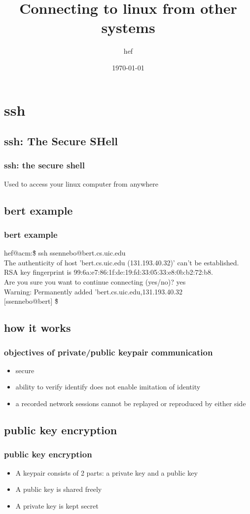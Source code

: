 \documentclass[hyperref={pdfpagelabels=false}]{beamer}
\title{Connecting to linux from other systems}
\author{hef}
\date{\today}
\begin{document}
\frame{\titlepage}
\section[outline]{}
\frame[shrink]{\tableofcontents}
\section{ssh}
\subsection{ssh: The Secure SHell}
\frame
{
  \frametitle{ssh: the secure shell}
  Used to access your linux computer from anywhere
}
\subsection{bert example}
\frame
{
  \frametitle{bert example}
  hef@acm:\~\$ ssh ssennebo@bert.cs.uic.edu\\
  The authenticity of host 'bert.cs.uic.edu (131.193.40.32)' can't be established.\\
  RSA key fingerprint is 99:6a:e7:86:1f:de:19:fd:33:05:33:e8:0b:b2:72:b8.\\
  Are you sure you want to continue connecting (yes/no)? yes\\
  Warning: Permanently added 'bert.cs.uic.edu,131.193.40.32\\
  $[$ssennebo@bert$]$ \~\$
}
\subsection{how it works}
\frame
{
  \frametitle{objectives of private/public keypair communication}
  \begin{itemize}
  \item{secure}
  \item{ability to verify identify does not enable imitation of identity}
  \item{a recorded network sessions cannot be replayed or reproduced by either side}
  \end{itemize}
}
\subsection{public key encryption}
\frame
{
    \frametitle{public key encryption}
    \begin{itemize}
    \item{A keypair consists of 2 parts: a private key and a public key}
    \item{A public key is shared freely}
    \item{A private key is kept secret}
    \end{itemize}
}
\end{document}
